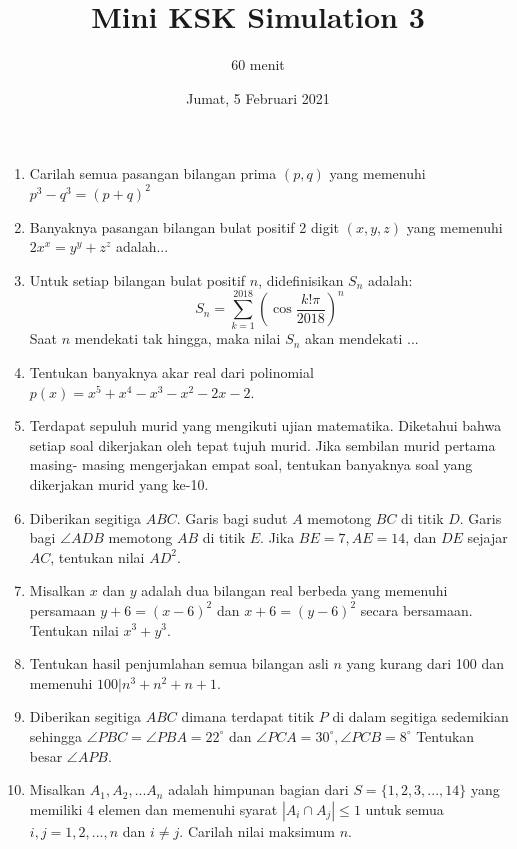 \documentclass[12pt]{scrartcl}
\title{Mini KSK Simulation 3}
\author{60 menit}
\date{Jumat, 5 Februari 2021}
\begin{document}
	\maketitle

\renewcommand*\contentsname{Daftar Isi}
\tableofcontents

\newpage
	
	
	\begin{enumerate}
		\item Carilah semua pasangan bilangan prima $(p,q)$ yang memenuhi $p^3-q^3=(p+q)^2$
		
		\item
		Banyaknya pasangan bilangan bulat positif 2 digit $(x,y,z)$ yang memenuhi $2x^x=y^y+z^z$ adalah...
		
		\item
		Untuk setiap bilangan bulat positif $n$, didefinisikan $S_n$ adalah: $$ S_n = \sum_{k=1}^{2018} \left( \cos \frac{k!\pi}{2018} \right)^n$$
		Saat $n$ mendekati tak hingga, maka nilai $S_n$ akan mendekati ...
		
		
		\item
		Tentukan banyaknya akar real dari polinomial $p(x)=x^5+x^4-x^3-x^2-2x-2.$
		
		
			
		
		
		
		\item 
		Terdapat sepuluh murid yang mengikuti ujian matematika. Diketahui bahwa setiap soal dikerjakan oleh tepat tujuh murid. Jika sembilan murid pertama masing-
		masing mengerjakan empat soal, tentukan banyaknya soal yang dikerjakan murid yang ke-10.
		
		\item
		Diberikan segitiga $ABC$. Garis bagi sudut $A$ memotong $BC$ di titik $D$. Garis bagi
		$\angle ADB$ memotong $AB$ di titik $E$. Jika $BE = 7, AE = 14$, dan $DE$ sejajar $AC$,
		tentukan nilai $AD^2$.
		
		\item
		Misalkan $x$ dan $y$ adalah dua bilangan real berbeda yang memenuhi persamaan $y+6 = (x-6)^2$ dan $x+6 = (y-6)^2$ secara bersamaan. Tentukan nilai $x^3+y^3$.
		
		\item
		Tentukan hasil penjumlahan semua bilangan asli $n$ yang kurang dari 100 dan memenuhi $100|n^3+n^2+n+1$.
		
		\item
		Diberikan segitiga $ABC$ dimana terdapat titik $P$ di dalam segitiga sedemikian sehingga $\angle PBC = \angle PBA = 22^\circ$ dan $\angle PCA = 30^\circ, \angle PCB = 8^\circ$ Tentukan besar $\angle APB$.
		
		\item
		Misalkan $A_1, A_2, ... A_n$ adalah himpunan bagian dari $S = \{1,2,3,...,14 \}$ yang memiliki 4 elemen dan memenuhi syarat $|A_i \cap A_j| \le 1$ untuk semua $i,j = 1,2,...,n$ dan $i \neq j$. Carilah nilai maksimum $n$.
		
		
		
	\end{enumerate}
		
\end{document}
